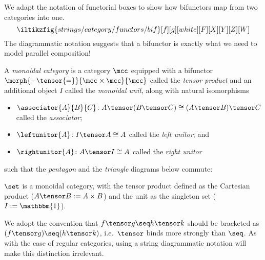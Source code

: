 We adapt the notation of functorial boxes to show how bifunctors map from two
categories into one.
\[
    \iltikzfig{strings/category/functors/bif}[f][g][white][F][X][Y][Z][W]
\]
The diagrammatic notation suggests that a bifunctor is exactly what we need to
model parallel composition!

\begin{definition}
    \label{def:monoidal-category}
    A \emph{monoidal category} is a category \(\mcc\) equipped with a
    bifunctor \(\morph{{-} \tensor {=}}{\mcc \times \mcc}{\mcc}\) called the
    \emph{tensor product} and an additional object \(I\) called the
    \emph{monoidal unit},
    along with natural isomorphisms
    \begin{itemize}
        \item \(
            \associator{A}{B}{C}
            \colon
            A \tensor (B \tensor C)
            \cong
            (A \tensor B) \tensor C
            \) called the \emph{associator};
        \item \(
            \leftunitor{A}
            \colon
            I \tensor A
            \cong
            A
            \) called the \emph{left unitor}; and
        \item \(
            \rightunitor{A}
            \colon
            A \tensor I
            \cong
            A
            \) called the \emph{right unitor}
    \end{itemize}
    such that the \emph{pentagon} and the \emph{triangle} diagrams below
    commute:
    \begin{center}
        

        \vspace{1em}

        
    \end{center}
\end{definition}

\begin{example}
    \(\set\) is a monoidal category, with the tensor product defined as the
    Cartesian product (\(A \tensor B := A \times B\)) and the unit as the
    singleton set (\(I := \mathbbm{1}\)).
\end{example}


We adopt the convention that \(f \tensor g \seq h \tensor k\) should be
bracketed as \((f \tensor g) \seq (h \tensor k)\), i.e.\ \(\tensor\) binds
more strongly than \(\seq\).
As with the case of regular categories, using a string diagrammatic notation
will make this distinction irrelevant.

